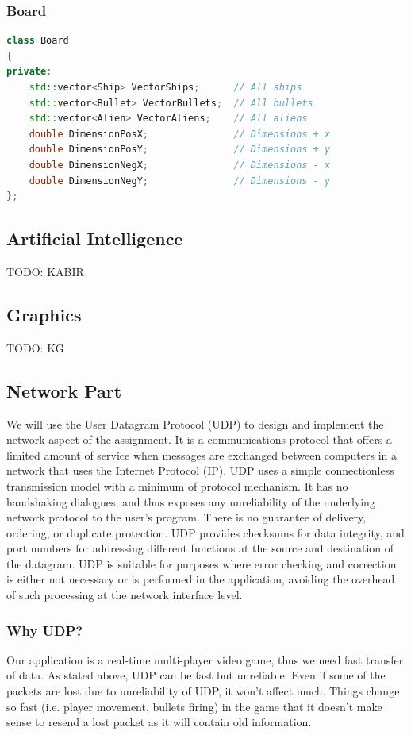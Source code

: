 \documentclass{article}
\begin{document}
				\subsubsection{Board}
					\begin{lstlisting}[language=C++, caption={Class Parameters for Board}]
class Board
{
private:
	std::vector<Ship> VectorShips;		// All ships
	std::vector<Bullet> VectorBullets;	// All bullets
	std::vector<Alien> VectorAliens;	// All aliens
	double DimensionPosX;				// Dimensions + x	
	double DimensionPosY;				// Dimensions + y	
	double DimensionNegX;				// Dimensions - x	
	double DimensionNegY;				// Dimensions - y		
};
					\end{lstlisting}
			\subsection{Artificial Intelligence}
				TODO: KABIR
			\subsection{Graphics}
				TODO: KG
			\subsection{Network Part}
				We will use the User Datagram Protocol (UDP) to design and implement the network aspect of the assignment. It is a communications protocol that offers a limited amount of service when messages are exchanged between computers in a network that uses the Internet Protocol (IP).
				UDP uses a simple connectionless transmission model with a minimum of protocol mechanism. It has no handshaking dialogues, and thus exposes any unreliability of the underlying network protocol to the user's program. There is no guarantee of delivery, ordering, or duplicate protection. UDP provides checksums for data integrity, and port numbers for addressing different functions at the source and destination of the datagram. UDP is suitable for purposes where error checking and correction is either not necessary or is performed in the application, avoiding the overhead of such processing at the network interface level.
				\subsubsection{Why UDP?}
					Our application is a real-time multi-player video game, thus we need fast transfer of data. As stated above, UDP can be fast but unreliable. Even if some of the packets are lost due to unreliability of UDP, it won't affect much. Things change so fast (i.e. player movement, bullets firing) in the game that it doesn't make sense to resend a lost packet as it will contain old information. 
\end{document}
